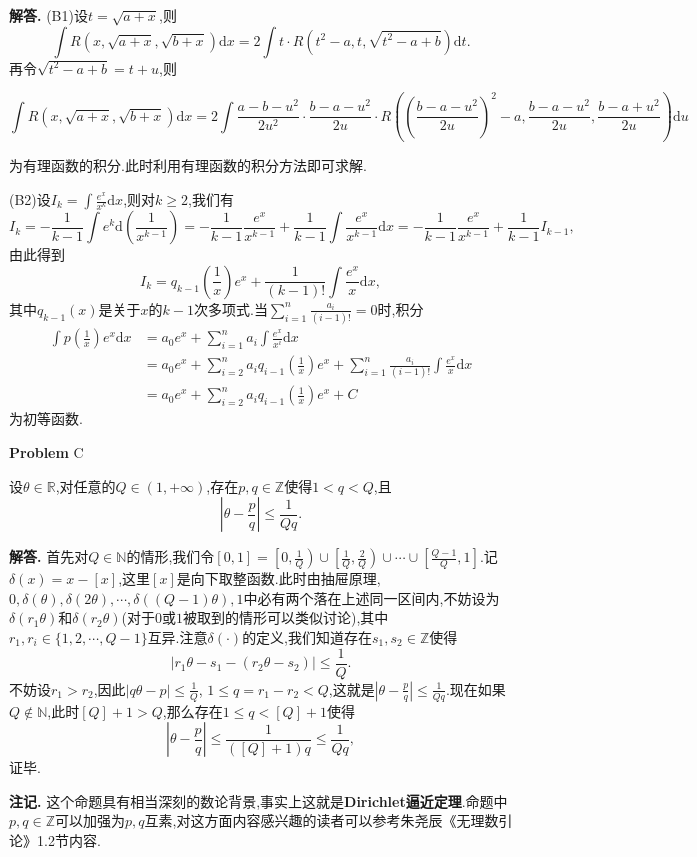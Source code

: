 \documentclass{article}
\newcounter{problemname}
\newenvironment{problem}{\begin{shaded}\stepcounter{problemname}\par\noindent\textbf{Problem }}{\end{shaded}\par}
\newenvironment{solution}{\par\noindent\textbf{解答. }}{\par}
\newenvironment{note}{\par\noindent\textbf{注记. }}{\par}
\begin{document}
\begin{solution}
(B1)设$t=\sqrt{a+x}$,则
$$
\int{R\left( x,\sqrt{a+x},\sqrt{b+x} \right) \mathrm{d}x}=2\int{t\cdot R\left( t^2-a,t,\sqrt{t^2-a+b} \right) \mathrm{d}t}.
$$
再令$\sqrt{t^2-a+b}=t+u$,则
\begin{small}
$$
\int{R\left( x,\sqrt{a+x},\sqrt{b+x} \right) \mathrm{d}x}=2\int{\frac{a-b-u^2}{2u^2}\cdot \frac{b-a-u^2}{2u}\cdot R\left( \left( \frac{b-a-u^2}{2u} \right) ^2-a,\frac{b-a-u^2}{2u},\frac{b-a+u^2}{2u} \right) \mathrm{d}u}
$$
\end{small}
为有理函数的积分.此时利用有理函数的积分方法即可求解.\par
(B2)设$I_k=\int\frac{e^x}{x^k}\mathrm{d}x$,则对$k\ge 2$,我们有
$$
I_k=-\frac{1}{k-1}\int{e^k\mathrm{d}\left( \frac{1}{x^{k-1}} \right)}=-\frac{1}{k-1}\frac{e^x}{x^{k-1}}+\frac{1}{k-1}\int{\frac{e^x}{x^{k-1}}\mathrm{d}x}=-\frac{1}{k-1}\frac{e^x}{x^{k-1}}+\frac{1}{k-1}I_{k-1},
$$
由此得到
$$
I_k=q_{k-1}\left( \frac{1}{x} \right) e^x+\frac{1}{\left( k-1 \right) !}\int{\frac{e^x}{x}\mathrm{d}x},
$$
其中$q_{k-1}(x)$是关于$x$的$k-1$次多项式.当$\sum_{i=1}^n\frac{a_i}{(i-1)!}=0$时,积分
$$
\begin{aligned}
\int{p\left( \frac{1}{x} \right) e^x\mathrm{d}x}&=a_0e^x+\sum_{i=1}^n{a_i\int{\frac{e^x}{x^i}\mathrm{d}x}}
\\
&=a_0e^x+\sum_{i=2}^n{a_iq_{i-1}\left( \frac{1}{x} \right) e^x}+\sum_{i=1}^n{\frac{a_i}{\left( i-1 \right) !}\int{\frac{e^x}{x}\mathrm{d}x}}
\\
&=a_0e^x+\sum_{i=2}^n{a_iq_{i-1}\left( \frac{1}{x} \right) e^x}+C
\end{aligned}
$$
为初等函数.
\end{solution}
\begin{problem}{C}\par
设$\theta\in\mathbb{R}$,对任意的$Q\in(1,+\infty)$,存在$p,q\in\mathbb{Z}$使得$1<q<Q$,且
$$\left|\theta-\frac{p}{q}\right|\le\frac{1}{Qq}.$$
\end{problem}
\begin{solution}
首先对$Q\in\mathbb{N}$的情形,我们令$\left[ 0,1 \right] =\left[ 0,\frac{1}{Q} \right) \cup \left[ \frac{1}{Q},\frac{2}{Q} \right) \cup \cdots \cup \left[ \frac{Q-1}{Q},1 \right] $.记$\delta(x)=x-[x]$,这里$[x]$是向下取整函数.此时由抽屉原理,$0,\delta \left( \theta \right) ,\delta \left( 2\theta \right) ,\cdots ,\delta \left( \left( Q-1 \right) \theta \right) ,1$中必有两个落在上述同一区间内,不妨设为$\delta(r_1\theta)$和$\delta(r_2\theta)$(对于$0$或$1$被取到的情形可以类似讨论),其中$r_1,r_i\in\{1,2,\cdots,Q-1\}$互异.注意$\delta(\cdot)$的定义,我们知道存在$s_1,s_2\in\mathbb{Z}$使得
$$|r_1\theta-s_1-(r_2\theta-s_2)|\le\frac{1}{Q}.$$
不妨设$r_1>r_2$,因此$|q\theta-p|\le\frac{1}{Q}$, $1\le q=r_1-r_2<Q$,这就是$\left|\theta-\frac{p}{q}\right|\le\frac{1}{Qq}$.现在如果$Q\notin\mathbb{N}$,此时$[Q]+1>Q$,那么存在$1\le q<[Q]+1$使得
$$\left|\theta-\frac{p}{q}\right|\le\frac{1}{([Q]+1)q}\le\frac{1}{Qq},$$
证毕.
\end{solution}
\begin{note}
这个命题具有相当深刻的数论背景,事实上这就是\textbf{Dirichlet逼近定理}.命题中$p,q\in\mathbb{Z}$可以加强为$p,q$互素,对这方面内容感兴趣的读者可以参考朱尧辰《无理数引论》1.2节内容.
\end{note}
\newpage
\end{document}

